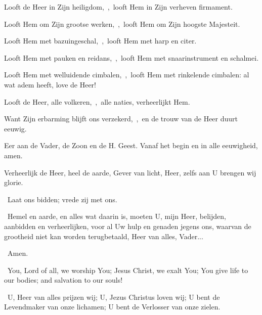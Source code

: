 \documentclass[12pt,twoside,a5paper]{article}
\begin{document}
\begin{halfparskip}
   Looft de Heer in Zijn heiligdom,~\sep\ looft Hem in Zijn verheven firmament.

  Looft Hem om Zijn grootse werken,~\sep\ looft Hem om Zijn hoogste Majesteit.

  Looft Hem met bazuingeschal,~\sep\ looft Hem met harp en citer.

  Looft Hem met pauken en reidans,~\sep\ looft Hem met snaarinstrument en schalmei.

  Looft Hem met welluidende cimbalen,~\sep\ looft Hem met rinkelende cimbalen: al wat adem heeft, love de Heer!
\end{halfparskip}

\begin{halfparskip}
   Looft de Heer, alle volkeren,~\sep\ alle naties, verheerlijkt Hem.

  Want Zijn erbarming blijft ons verzekerd,~\sep\ en de trouw van de Heer duurt eeuwig.

  Eer aan de Vader, de Zoon en de H. Geest. Vanaf het begin en in alle eeuwigheid, amen.

  Verheerlijk de Heer, heel de aarde, Gever van licht, Heer, zelfs aan U brengen wij glorie.
\end{halfparskip}

\begin{halfparskip}
  \dd~Laat ons bidden; vrede zij met ons.

  \cc~Hemel en aarde, en alles wat daarin is, moeten U, mijn Heer, belijden, aanbidden en verheerlijken, voor al Uw hulp en genaden jegens ons, waarvan de grootheid niet kan worden terugbetaald, Heer van alles, Vader...

  \rr~Amen.
\end{halfparskip}




\vspace{\parskip}
\begin{doublecols}
  \englishl \rr~You, Lord of all, we worship You; Jesus Christ, we exalt You; You give life to our bodies; and salvation to our souls!

   \rr~U, Heer van alles prijzen wij; U, Jezus Christus loven wij; U bent de Levendmaker van onze lichamen; U bent de Verlosser van onze zielen.
\end{doublecols}
\end{document}
